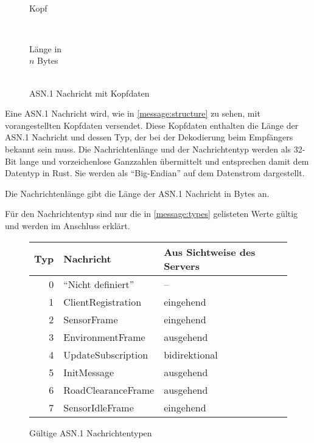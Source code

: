 \begin{wrapfigure}{R}[-1.5em]{.5\textwidth}
	\centering
	\begin{bytefield}[bitwidth=.45em,bitheight=.7em]{32}
		 \\
		
		\begin{rightwordgroup}{Kopf}
			 \\
		\end{rightwordgroup} \\
		
		\begin{rightwordgroup}{Länge in\\\textbf{$n$} Bytes}
			 \\
			\skippedwords \\
		\end{rightwordgroup}
	\end{bytefield}
	\caption{ASN.1 Nachricht mit Kopfdaten}
	\label{message:structure}
\end{wrapfigure}

Eine ASN.1 Nachricht wird, wie in \autoref{message:structure} zu sehen, mit  vorangestellten Kopfdaten versendet.
Diese Kopfdaten enthalten die Länge der ASN.1 Nachricht und dessen Typ, der bei der Dekodierung beim Empfängers bekannt sein muss.
Die Nachrichtenlänge und der Nachrichtentyp werden als 32-Bit lange und vorzeichenlose Ganzzahlen übermittelt und entsprechen damit dem Datentyp  in Rust.
Sie werden als \enquote{Big-Endian} auf dem Datenstrom dargestellt.

Die Nachrichtenlänge gibt die Länge der ASN.1 Nachricht in Bytes an.

Für den Nachrichtentyp sind nur die in \autoref{message:types} gelisteten Werte gültig und werden im Anschluss erklärt.

\begin{figure}[H]
	\centering
	\begin{tabular}{r|l|l}
		Typ & Nachricht & Aus Sichtweise des Servers \\
		\hline
		0 & \enquote{Nicht definiert} & -- \\
		1 & ClientRegistration & eingehend \\
		2 & SensorFrame & eingehend \\
		3 & EnvironmentFrame & ausgehend \\
		4 & UpdateSubscription & bidirektional \\
		5 & InitMessage & ausgehend \\
		6 & RoadClearanceFrame & ausgehend \\
		7 & SensorIdleFrame & eingehend \\
	\end{tabular}
	\caption{Gültige ASN.1 Nachrichtentypen}
	\label{message:types}
\end{figure}

